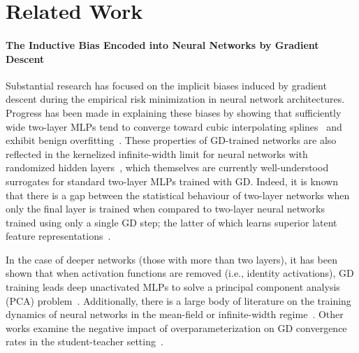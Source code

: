 \section{Related Work}
\label{s:Introduction__ss:RelatedWork}

\paragraph{The Inductive Bias Encoded into Neural Networks by Gradient Descent}
Substantial research has focused on the implicit biases induced by gradient descent during the empirical risk minimization in neural network architectures. Progress has been made in explaining these biases by showing that sufficiently wide two-layer MLPs tend to converge toward cubic interpolating splines~\citep{jin2023implicit} and exhibit benign overfitting~\citep{pmlr-v178-shamir22a}. These properties of GD-trained networks are also reflected in the kernelized infinite-width limit for neural networks with randomized hidden layers~\citep{heiss2023implicit,mei2022generalization}, which themselves are currently well-understood~\citep{gonon2020risk,gonon2023approximation} surrogates for standard two-layer MLPs trained with GD. Indeed, it is known that there is a gap between the statistical behaviour of two-layer networks when only the final layer is trained when compared to two-layer neural networks trained using only a single GD step; the latter of which learns superior latent feature representations~\citep{ba2022high}.

\hspace{2em}In the case of deeper networks (those with more than two layers), it has been shown that when activation functions are removed (i.e., identity activations), GD training leads deep unactivated MLPs to solve a principal component analysis (PCA) problem~\citep{arora2018a}. 
Additionally, there is a large body of literature on the training dynamics of neural networks in the mean-field or infinite-width regime~\citep{pmlr-v195-abbe23a,pmlr-v119-golikov20a}. Other works examine the negative impact of overparameterization on GD convergence rates in the student-teacher setting~\cite{xu2023over}. 

